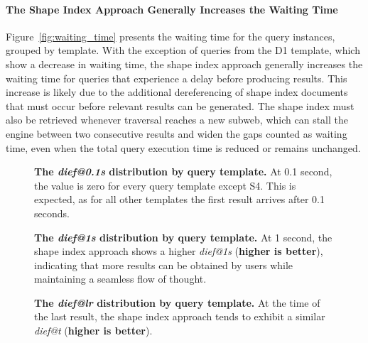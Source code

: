 \paragraph{The Shape Index Approach Generally Increases the Waiting Time}
Figure~\ref{fig:waiting_time} presents the waiting time for the query instances, grouped by template.
With the exception of queries from the D1 template, which show a decrease in waiting time, the shape index approach generally increases the waiting time for queries that experience a delay before producing results.
This increase is likely due to the additional dereferencing of shape index documents that must occur before relevant results can be generated.
The shape index must also be retrieved whenever traversal reaches a new subweb, which can stall the engine between two consecutive results and widen the gaps counted as waiting time, even when the total query execution time is reduced or remains unchanged.


\begin{figure}
	\centering
	\def\svgwidth{\linewidth}
	
	\caption{
		\textbf{The \textit{dief@0.1s} distribution by query template.}
		At 0.1 second, the value is zero for every query template except S4. This is expected, as for all other templates the first result arrives after 0.1 seconds.}
	\label{fig:dief_01}
\end{figure}

\begin{figure}
	\centering
	\def\svgwidth{\linewidth}
	
	\caption{
		\textbf{The \textit{dief@1s} distribution by query template.}
		At 1 second, the shape index approach shows a higher \textit{dief@1s} (\textbf{higher is better}), indicating that more results can be obtained by users while maintaining a seamless flow of thought.}
	\label{fig:dief_1}
\end{figure}


\begin{figure}
	\centering
	\def\svgwidth{\linewidth}
	
	\caption{
		\textbf{The \textit{dief@lr} distribution by query template.}
		At the time of the last result, the shape index approach tends to exhibit a similar \textit{dief@t} (\textbf{higher is better}).}
	\label{fig:dief_lr}
\end{figure}

